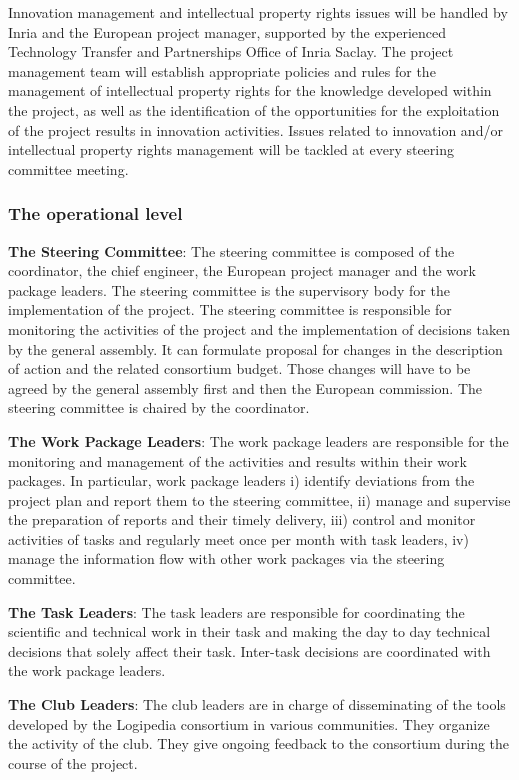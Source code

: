 Innovation management and intellectual property rights issues will be
handled by Inria and the European project manager, supported by the
experienced Technology Transfer and Partnerships Office of Inria
Saclay. The project management team will establish appropriate
policies and rules for the management of intellectual property rights
for the knowledge developed within the project, as well as the
identification of the opportunities for the exploitation of the
project results in innovation activities. Issues related to innovation
and/or intellectual property rights management will be tackled at
every steering committee meeting.

\subsubsection*{The operational level}

\begin{compactitem}
\item{\bf The Steering Committee}: The steering committee is composed of
the coordinator, the chief engineer, the European project
manager and the work package leaders. The steering committee is the
supervisory body for the implementation of the project. The steering
committee is responsible for monitoring the activities of the project
and the implementation of decisions taken by the general assembly. It
can formulate proposal for changes in the description of action and
the related consortium budget. Those changes will have to be agreed
by the general assembly first and then the European
commission. The steering committee is chaired by the 
coordinator.

\item{\bf The Work Package Leaders}: The work package leaders are
responsible for the monitoring and management of the activities and
results within their work packages. In particular, work package
leaders i) identify deviations from the project plan and report them
to the steering committee, ii) manage and supervise the preparation of
reports and their timely delivery, iii) control and monitor activities
of tasks and regularly meet once per month with task leaders, iv)
manage the information flow with other work packages via the steering
committee.

\item{\bf The Task Leaders}: The task leaders are responsible for
coordinating the scientific and technical work in their task and
making the day to day technical decisions that solely affect their
task. Inter-task decisions are coordinated with the work package
leaders.

\item{\bf The Club Leaders}: The club leaders are in charge of
disseminating of the tools developed by the Logipedia consortium in
various communities. They organize the activity of the club. They give
ongoing feedback to the consortium during the course of the project.
\end{compactitem}

